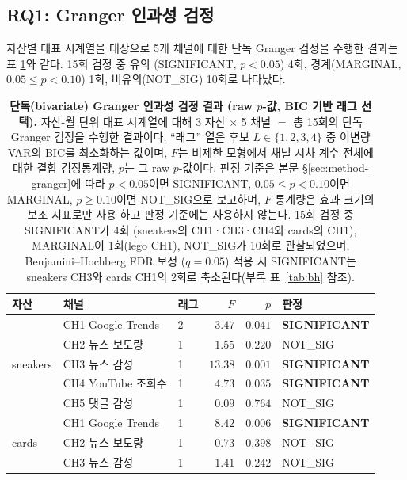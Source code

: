 \documentclass[11pt, a4paper, twocolumn]{article}
\begin{document}
\subsection{RQ1: Granger 인과성 검정}\label{sec:results-rq1}

자산별 대표 시계열을 대상으로 5개 채널에 대한 단독 Granger 검정을
수행한 결과는 표 \ref{tab:granger}와 같다. 15회 검정 중 유의
(SIGNIFICANT, $p<0.05$) 4회, 경계(MARGINAL, $0.05\leq p<0.10$) 1회,
비유의(NOT\_SIG) 10회로 나타났다.

\begin{table}[!tbp]
\centering\small
\caption[Granger 인과성 검정 결과]{\textbf{단독(bivariate) Granger
인과성 검정 결과 (raw $p$-값, BIC 기반 래그 선택).} 자산-월 단위
대표 시계열에 대해 3 자산 $\times$ 5 채널 $=$ 총 15회의 단독 Granger
검정을 수행한 결과이다. ``래그'' 열은 후보 $L\in\{1,2,3,4\}$ 중
이변량 VAR의 BIC를 최소화하는 값이며, $F$는 비제한 모형에서 채널
시차 계수 전체에 대한 결합 검정통계량, $p$는 그 raw $p$-값이다.
판정 기준은 본문 \S\ref{sec:method-granger}에 따라 $p<0.05$이면
SIGNIFICANT, $0.05\leq p<0.10$이면 MARGINAL, $p\geq 0.10$이면
NOT\_SIG으로 보고하며, $F$ 통계량은 효과 크기의 보조 지표로만 사용
하고 판정 기준에는 사용하지 않는다. 15회 검정 중 SIGNIFICANT가 4회
(sneakers의 CH1·CH3·CH4와 cards의 CH1), MARGINAL이 1회(lego CH1),
NOT\_SIG가 10회로 관찰되었으며, Benjamini--Hochberg FDR 보정
($q=0.05$) 적용 시 SIGNIFICANT는 sneakers CH3와 cards CH1의 2회로
축소된다(부록 표~\ref{tab:bh} 참조).}
\label{tab:granger}
\begin{tabular}{lllrrl}
\toprule
자산 & 채널 & 래그 & $F$ & $p$ & 판정 \\
\midrule
\multirow{5}{*}{sneakers}
 & CH1 Google Trends & 2 & $\mathbf{3.47}$ & $\mathbf{0.041}$ & \textbf{SIGNIFICANT} \\
 & CH2 뉴스 보도량   & 1 & $1.55$ & $0.220$ & NOT\_SIG \\
 & CH3 뉴스 감성     & 1 & $\mathbf{13.38}$ & $\mathbf{0.001}$ & \textbf{SIGNIFICANT} \\
 & CH4 YouTube 조회수 & 1 & $\mathbf{4.73}$ & $\mathbf{0.035}$ & \textbf{SIGNIFICANT} \\
 & CH5 댓글 감성     & 1 & $0.09$ & $0.764$ & NOT\_SIG \\
\midrule
\multirow{5}{*}{cards}
 & CH1 Google Trends & 1 & $\mathbf{8.42}$ & $\mathbf{0.006}$ & \textbf{SIGNIFICANT} \\
 & CH2 뉴스 보도량   & 1 & $0.73$ & $0.398$ & NOT\_SIG \\
 & CH3 뉴스 감성     & 1 & $1.41$ & $0.242$ & NOT\_SIG \\

\end{tabular}
\end{table}
\end{document}
